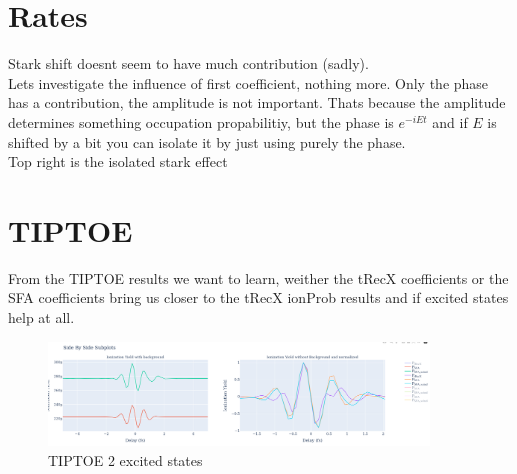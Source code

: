 \section{Rates}
Stark shift doesnt seem to have much contribution (sadly).\\
Lets investigate the influence of first coefficient, nothing more. Only the phase has a contribution, the amplitude is not important.
Thats because the amplitude determines something occupation propabilitiy, but the phase is $e^{-iEt}$ and if $E$ is shifted by a bit you can isolate it by just using purely the phase.\\
Top right is the isolated stark effect







\section{TIPTOE}
From the TIPTOE results we want to learn, weither the tRecX coefficients or the SFA coefficients bring us closer to the tRecX ionProb results and if excited states help at all.

\begin{figure}
    \centering
    \includegraphics[width=0.9\textwidth]{figures/image.png}
    \caption{TIPTOE 2 excited states}
    \label{fig:tiptoe}
\end{figure}

